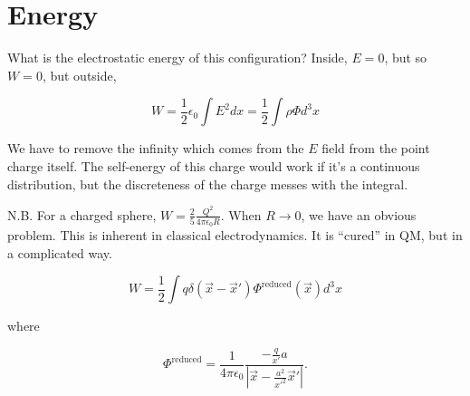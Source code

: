 \documentclass[a4paper,twoside,master.tex]{subfiles}
\begin{document}
\section*{Energy}%
\label{sec:energy}

What is the electrostatic energy of this configuration? Inside, $E=0$, but so $W=0$, but outside,

\begin{equation}
   W = \frac{1}{2}\epsilon_0\int E^2dx = \frac{1}{2}\int\rho\Phi d^3x
\end{equation}

We have to remove the infinity which comes from the $E$ field from the point charge itself. The self-energy of this charge would work if it's a continuous distribution, but the discreteness of the charge messes with the integral.

\begin{note}{N.B.}
For a charged sphere, $W=\frac{2}{5}\frac{Q^2}{4\pi\epsilon_0 R}$. When $R\to 0$, we have an obvious problem. This is inherent in classical electrodynamics. It is ``cured'' in QM, but in a complicated way.
\end{note}

\begin{equation}
   W = \frac{1}{2}\int q\delta(\vec{x}-\vec{x}')\Phi^{\text{reduced}}(\vec{x})d^3x
\end{equation}

where

\begin{equation}
   \Phi^\text{reduced} = \frac{1}{4\pi\epsilon_0}\frac{-\frac{q}{x'}a}{\left|\vec{x}-\frac{a^2}{x'^2}\vec{x}'\right|}.
\end{equation}
\end{document}

